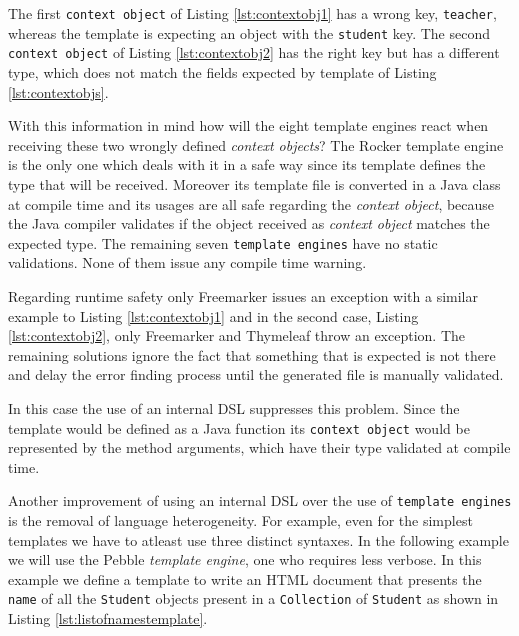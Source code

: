 \noindent
The first \texttt{context object} of Listing \ref{lst:contextobj1} has a wrong key, \texttt{teacher}, whereas the template is expecting an object with the \texttt{student} key. The second \texttt{context object} of Listing \ref{lst:contextobj2} has the right key but has a different type, which does not match the fields expected by template of Listing \ref{lst:contextobjs}.

\noindent
With this information in mind how will the eight template engines react when receiving these two wrongly defined \textit{context objects}? The Rocker template engine is the only one which deals with it in a safe way since its template defines the type that will be received. Moreover its template file is converted in a Java class at compile time and its usages are all safe regarding the \textit{context object}, because the Java compiler validates if the object received as \textit{context object} matches the expected type. The remaining seven \texttt{template engines} have no static validations. None of them issue any compile time warning. 

\noindent
Regarding runtime safety only Freemarker issues an exception with a similar example to Listing \ref{lst:contextobj1} and in the second case, Listing \ref{lst:contextobj2}, only Freemarker and Thymeleaf throw an exception. The remaining solutions ignore the fact that something that is expected is not there and delay the error finding process until the generated file is manually validated. 

\noindent
In this case the use of an internal \ac{DSL} suppresses this problem. Since the template would be defined as a Java function its \texttt{context object} would be represented by the method arguments, which have their type validated at compile time.

\noindent
Another improvement of using an internal \ac{DSL} over the use of \texttt{template engines} is the removal of language heterogeneity. For example, even for the simplest templates we have to atleast use three distinct syntaxes. In the following example we will use the Pebble \textit{template engine}, one who requires less verbose. In this example we define a template to write an \ac{HTML} document that presents the \texttt{name} of all the \texttt{Student} objects present in a \texttt{Collection} of \texttt{Student} as shown in Listing \ref{lst:listofnamestemplate}.

\bigskip



